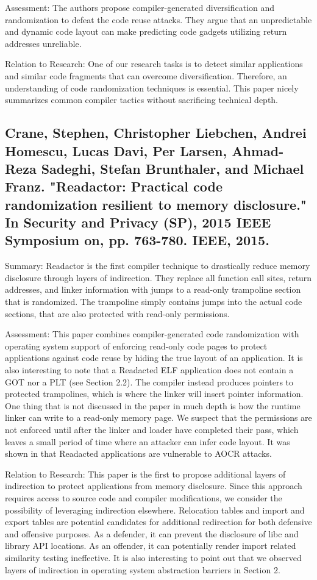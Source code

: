\documentclass[preprint,12pt]{elsarticle}
\begin{document}
Assessment: The authors propose compiler-generated diversification and randomization to defeat the code reuse attacks. They argue that an unpredictable and dynamic code layout can make predicting code gadgets utilizing return addresses unreliable.

Relation to Research: One of our research tasks is to detect similar applications and similar code fragments that can overcome diversification. Therefore, an understanding of code randomization techniques is essential. This paper nicely summarizes common compiler tactics without sacrificing technical depth.


\subsection{
\cite{crane2015readactor} Crane, Stephen, Christopher Liebchen, Andrei Homescu, Lucas Davi, Per Larsen, Ahmad-Reza Sadeghi, Stefan Brunthaler, and Michael Franz. "Readactor: Practical code randomization resilient to memory disclosure." In Security and Privacy (SP), 2015 IEEE Symposium on, pp. 763-780. IEEE, 2015.
}

Summary: Readactor is the first compiler technique to drastically reduce memory disclosure through layers of indirection. They replace all function call sites, return addresses, and linker information with jumps to a read-only trampoline section that is randomized. The trampoline simply contains jumps into the actual code sections, that are also protected with read-only permissions.

Assessment: This paper combines compiler-generated code randomization with operating system support of enforcing read-only code pages to protect applications against code reuse by hiding the true layout of an application. It is also interesting to note that a Readacted ELF application does not contain a GOT nor a PLT (see Section 2.2). The compiler instead produces pointers to protected trampolines, which is where the linker will insert pointer information. One thing that is not discussed in the paper in much depth is how the runtime linker can write to a read-only memory page. We suspect that the permissions are not enforced until after the linker and loader have completed their pass, which leaves a small period of time where an attacker can infer code layout. It was shown in \cite{rudd2017address} that Readacted applications are vulnerable to AOCR attacks.

Relation to Research: This paper is the first to propose additional layers of indirection to protect applications from memory disclosure. Since this approach requires access to source code and compiler modifications, we consider the possibility of leveraging indirection elsewhere. Relocation tables and import and export tables are potential candidates for additional redirection for both defensive and offensive purposes. As a defender, it can prevent the disclosure of libc and library API locations. As an offender, it can potentially render import related similarity testing \cite{imphash} ineffective. It is also interesting to point out that we observed layers of indirection in operating system abstraction barriers in Section 2.
\end{document}
